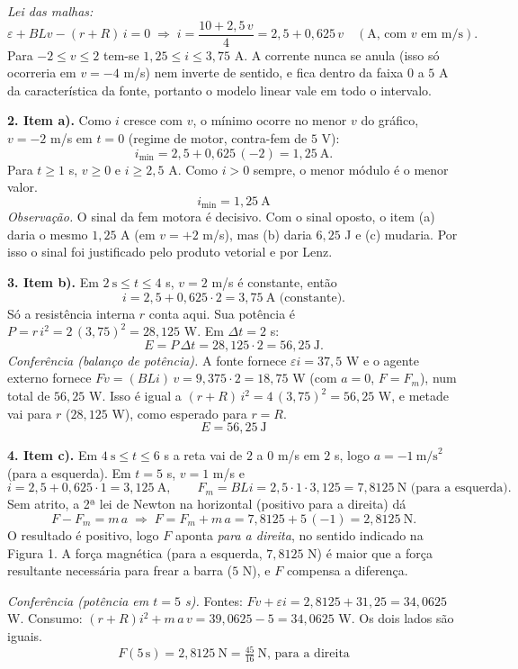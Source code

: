 \documentclass{article}%
\begin{document}
\emph{Lei das malhas:}
\[
\varepsilon+BLv-(r+R)\,i=0\;\Rightarrow\; i=\frac{10+2{,}5\,v}{4}=2{,}5+0{,}625\,v\quad(\text{A, com } v \text{ em m/s}).
\]
Para $-2\le v\le 2$ tem-se $1{,}25\le i\le 3{,}75$ A. A corrente nunca se anula (isso só ocorreria em $v=-4$ m/s) nem inverte de sentido, e fica dentro da faixa $0$ a $5$ A da característica da fonte, portanto o modelo linear vale em todo o intervalo.

\textbf{2. Item a).} Como $i$ cresce com $v$, o mínimo ocorre no menor $v$ do gráfico, $v=-2$ m/s em $t=0$ (regime de motor, contra-fem de $5$ V):
\[
i_{\min}=2{,}5+0{,}625\,(-2)=1{,}25\ \text{A}.
\]
Para $t\ge1$ s, $v\ge0$ e $i\ge2{,}5$ A. Como $i>0$ sempre, o menor módulo é o menor valor.
\[
\boxed{i_{\min}=1{,}25\ \text{A}}
\]
\emph{Observação.} O sinal da fem motora é decisivo. Com o sinal oposto, o item (a) daria o mesmo $1{,}25$ A (em $v=+2$ m/s), mas (b) daria $6{,}25$ J e (c) mudaria. Por isso o sinal foi justificado pelo produto vetorial e por Lenz.

\textbf{3. Item b).} Em $2\ \text{s}\le t\le 4$ s, $v=2$ m/s é constante, então
\[
i=2{,}5+0{,}625\cdot 2=3{,}75\ \text{A (constante)}.
\]
Só a resistência interna $r$ conta aqui. Sua potência é $P=r\,i^2=2\,(3{,}75)^2=28{,}125$ W. Em $\Delta t=2$ s:
\[
E=P\,\Delta t=28{,}125\cdot 2=56{,}25\ \text{J}.
\]
\emph{Conferência (balanço de potência).} A fonte fornece $\varepsilon i=37{,}5$ W e o agente externo fornece $F v=(BLi)\,v=9{,}375\cdot 2=18{,}75$ W (com $a=0$, $F=F_m$), num total de $56{,}25$ W. Isso é igual a $(r+R)\,i^2=4\,(3{,}75)^2=56{,}25$ W, e metade vai para $r$ ($28{,}125$ W), como esperado para $r=R$.
\[
\boxed{E=56{,}25\ \text{J}}
\]

\textbf{4. Item c).} Em $4\ \text{s}\le t\le 6$ s a reta vai de $2$ a $0$ m/s em $2$ s, logo $a=-1\ \text{m/s}^2$ (para a esquerda). Em $t=5$ s, $v=1$ m/s e
\[
i=2{,}5+0{,}625\cdot 1=3{,}125\ \text{A},\qquad F_m=BLi=2{,}5\cdot 1\cdot 3{,}125=7{,}8125\ \text{N (para a esquerda)}.
\]
Sem atrito, a 2ª lei de Newton na horizontal (positivo para a direita) dá
\[
F-F_m=m\,a\;\Rightarrow\;F=F_m+m\,a=7{,}8125+5\,(-1)=2{,}8125\ \text{N}.
\]
O resultado é positivo, logo $F$ aponta \emph{para a direita}, no sentido indicado na Figura 1. A força magnética (para a esquerda, $7{,}8125$ N) é maior que a força resultante necessária para frear a barra ($5$ N), e $F$ compensa a diferença.

\emph{Conferência (potência em $t=5$ s).} Fontes: $Fv+\varepsilon i=2{,}8125+31{,}25=34{,}0625$ W. Consumo: $(r+R)i^2+m\,a\,v=39{,}0625-5=34{,}0625$ W. Os dois lados são iguais.
\[
\boxed{F(5\,\text{s})=2{,}8125\ \text{N}=\tfrac{45}{16}\ \text{N, para a direita}}
\]
\end{document}
